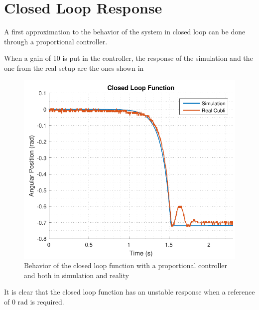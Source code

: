 \section{Closed Loop Response}\label{closedLoop}
A first approximation to the behavior of the system in closed loop can be done through a proportional controller.

When a gain of 10 is put in the controller, the response of the simulation and the one from the real setup are the ones shown in 

\begin{figure}[H] 
	\centering 
	\includegraphics[scale=0.6]{figures/closedLoopResponse}	
	\caption{Behavior of the closed loop function with a proportional controller and both in simulation and reality}
	\label{closedLoopResponse}
\end{figure}

It is clear that the closed loop function has an unstable response when a reference of 0 rad is required.
